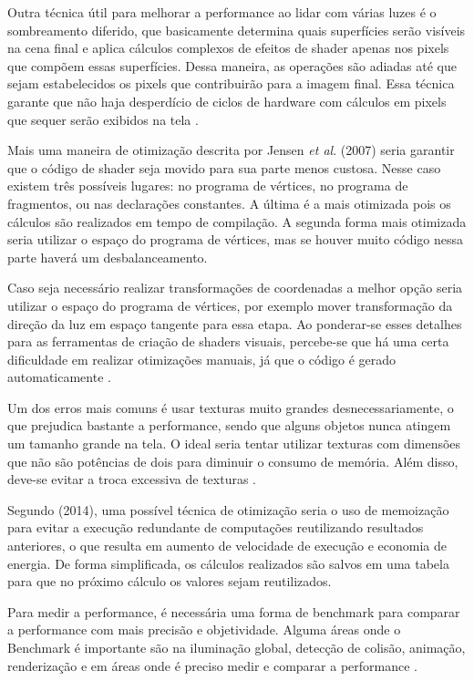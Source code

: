 Outra técnica útil para melhorar a performance ao lidar com várias luzes é o sombreamento diferido, que basicamente determina quais superfícies serão visíveis na cena final e aplica cálculos complexos de efeitos de shader apenas nos pixels que compõem essas superfícies. Dessa maneira, as operações são adiadas até que sejam estabelecidos os pixels que contribuirão para a imagem final. Essa técnica garante que não haja desperdício de ciclos de hardware com cálculos em pixels que sequer serão exibidos na tela \cite{GLSLBook}.

Mais uma maneira de otimização descrita por Jensen \textit{et al}. (2007) seria garantir que o código de shader seja movido para sua parte menos custosa. Nesse caso existem três possíveis lugares: no programa de vértices, no programa de fragmentos, ou nas declarações constantes. A última é a mais otimizada pois os cálculos são realizados em tempo de compilação. A segunda forma mais otimizada seria utilizar o espaço do programa de vértices, mas se houver muito código nessa parte haverá um desbalanceamento.

Caso seja necessário realizar transformações de coordenadas a melhor opção seria utilizar o espaço do programa de vértices, por exemplo mover transformação da direção da luz em espaço tangente para essa etapa. Ao ponderar-se esses detalhes para as ferramentas de criação de shaders visuais, percebe-se que há uma certa dificuldade em realizar otimizações manuais, já que o código é gerado automaticamente \cite{jensen2007shader}.

Um dos erros mais comuns é usar texturas muito grandes desnecessariamente, o que prejudica bastante a performance, sendo que alguns objetos nunca atingem um tamanho grande na tela. O ideal seria tentar utilizar texturas com dimensões que não são potências de dois para diminuir o consumo de memória. Além disso, deve-se evitar a troca excessiva de texturas \cite{riguer2002performance}.

Segundo  (2014), uma possível técnica de otimização seria o uso de memoização para evitar a execução redundante de computações reutilizando resultados anteriores, o que resulta em aumento de velocidade de execução e economia de energia. De forma simplificada, os cálculos realizados são salvos em uma tabela para que no próximo cálculo os valores sejam reutilizados.

Para medir a performance, é necessária uma forma de \Gls{benchmark} para comparar a performance com mais precisão e objetividade. Alguma áreas onde o Benchmark é importante são na iluminação global, detecção de colisão, animação, renderização e em áreas onde é preciso medir e comparar a performance \cite{lext2001ray}.

